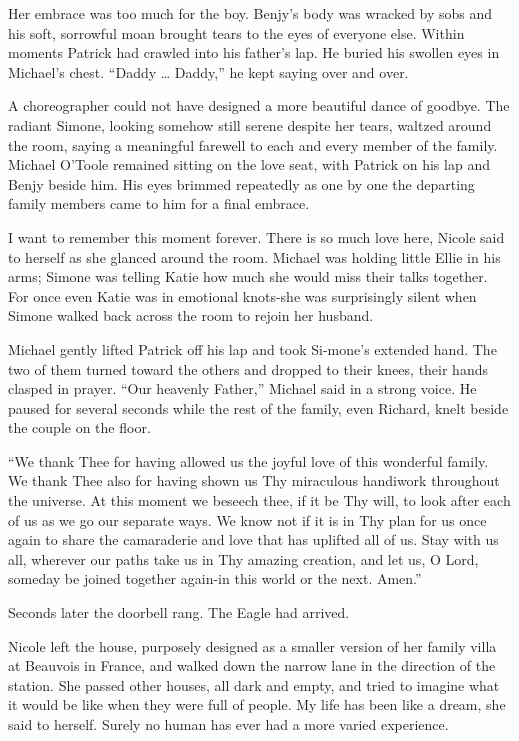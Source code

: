 \documentclass[]{article}
\begin{document}
{Her embrace was too much for the boy.  Benjy’s body was wracked by sobs and his soft, sorrowful moan brought tears to the eyes of everyone else.  Within moments Patrick had crawled into his father’s lap.  He buried his swollen eyes in Michael’s chest.  “Daddy … Daddy,” he kept saying over and over.

A choreographer could not have designed a more beautiful dance of goodbye.  The radiant Simone, looking somehow still serene despite her tears, waltzed around the room, saying a meaningful farewell to each and every member of the family.  Michael O’Toole remained sitting on the love seat, with Patrick on his lap and Benjy beside him.  His eyes brimmed repeatedly as one by one the departing family members came to him for a final embrace.

I want to remember this moment forever.  There is so much love here, Nicole said to herself as she glanced around the room.  Michael was holding little Ellie in his arms; Simone was telling Katie how much she would miss their talks together.  For once even Katie was in emotional knots-she was surprisingly silent when Simone walked back across the room to rejoin her husband.

Michael gently lifted Patrick off his lap and took Si-mone’s extended hand.  The two of them turned toward the others and dropped to their knees, their hands clasped in prayer.  “Our heavenly Father,” Michael said in a strong voice.  He paused for several seconds while the rest of the family, even Richard, knelt beside the couple on the floor.

“We thank Thee for having allowed us the joyful love of this wonderful family.  We thank Thee also for having shown us Thy miraculous handiwork throughout the universe.  At this moment we beseech thee, if it be Thy will, to look after each of us as we go our separate ways.  We know not if it is in Thy plan for us once again to share the camaraderie and love that has uplifted all of us.  Stay with us all, wherever our paths take us in Thy amazing creation, and let us, O Lord, someday be joined together again-in this world or the next.  Amen.”

Seconds later the doorbell rang.  The Eagle had arrived.

Nicole left the house, purposely designed as a smaller version of her family villa at Beauvois in France, and walked down the narrow lane in the direction of the station.  She passed other houses, all dark and empty, and tried to imagine what it would be like when they were full of people.  My life has been like a dream, she said to herself.  Surely no human has ever had a more varied experience.

}
\end{document}

